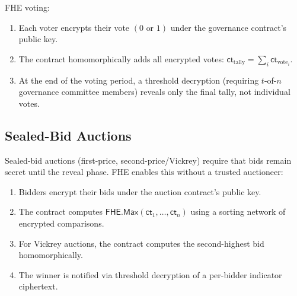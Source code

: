 FHE voting:
\begin{enumerate}[leftmargin=2em]
  \item Each voter encrypts their vote $(0 \text{ or } 1)$ under the governance
        contract's public key.
  \item The contract homomorphically adds all encrypted votes:
        $\textsf{ct}_{\text{tally}} = \sum_i \textsf{ct}_{\text{vote}_i}$.
  \item At the end of the voting period, a threshold decryption (requiring $t$-of-$n$
        governance committee members) reveals only the final tally, not individual
        votes.
\end{enumerate}

\subsection{Sealed-Bid Auctions}

Sealed-bid auctions (first-price, second-price/Vickrey) require that bids remain
secret until the reveal phase. FHE enables this without a trusted auctioneer:

\begin{enumerate}[leftmargin=2em]
  \item Bidders encrypt their bids under the auction contract's public key.
  \item The contract computes $\textsf{FHE.Max}(\textsf{ct}_1, \ldots, \textsf{ct}_n)$
        using a sorting network of encrypted comparisons.
  \item For Vickrey auctions, the contract computes the second-highest bid
        homomorphically.
  \item The winner is notified via threshold decryption of a per-bidder indicator
        ciphertext.
\end{enumerate}

